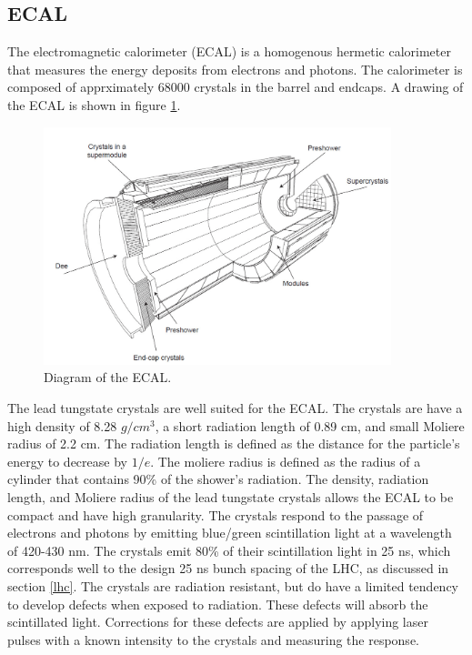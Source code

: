 \documentclass[oneside, letterpaper, oldfontcommands]{memoir}
\begin{document}
\subsection{ECAL}\label{ecal}

\qquad The electromagnetic calorimeter (ECAL) is a homogenous hermetic calorimeter that measures the energy deposits from electrons and photons. The calorimeter is composed of apprximately 68000 crystals in the barrel and endcaps. A drawing of the ECAL is shown in figure \ref{fig:cmsecal}.

\begin{figure}[here]
\includegraphics[width=0.9\textwidth]{cmsecal.png}
\caption{Diagram of the ECAL\cite{1748-0221-3-08-S08001}.}
\label{fig:cmsecal}
\end{figure}

\qquad The lead tungstate crystals are well suited for the ECAL. The crystals are have a high density of 8.28 $g/cm^{3}$, a short radiation length of 0.89 cm, and small Moliere radius of 2.2 cm. The radiation length is defined as the distance for the particle's energy to decrease by $1/e$. The moliere radius is defined as the radius of a cylinder that contains 90\% of the shower's radiation. The density, radiation length, and Moliere radius of the lead tungstate crystals allows the ECAL to be compact and have high granularity. The crystals respond to the passage of electrons and photons by emitting blue/green scintillation light at a wavelength of 420-430 nm. The crystals emit 80\% of their scintillation light in 25 ns, which corresponds well to the design 25 ns bunch spacing of the LHC, as discussed in section \ref{lhc}. The crystals are radiation resistant, but do have a limited tendency to develop defects when exposed to radiation. These defects will absorb the scintillated light. Corrections for these defects are applied by applying laser pulses with a known intensity to the crystals and measuring the response.
\end{document}

